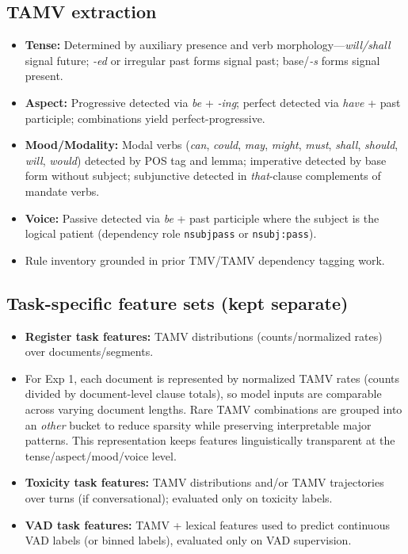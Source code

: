 \documentclass[11pt]{article}
\begin{document}
\subsection{TAMV extraction}
\begin{itemize}
  \item \textbf{Tense:} Determined by auxiliary presence and verb morphology---\emph{will/shall} signal future; \emph{-ed} or irregular past forms signal past; base/\emph{-s} forms signal present. \citep{Biber20101999LongmanEnglish}
  \item \textbf{Aspect:} Progressive detected via \emph{be} + \emph{-ing}; perfect detected via \emph{have} + past participle; combinations yield perfect-progressive. \citep{Biber20101999LongmanEnglish}
  \item \textbf{Mood/Modality:} Modal verbs (\emph{can}, \emph{could}, \emph{may}, \emph{might}, \emph{must}, \emph{shall}, \emph{should}, \emph{will}, \emph{would}) detected by POS tag and lemma; imperative detected by base form without subject; subjunctive detected in \emph{that}-clause complements of mandate verbs. \citep{Biber20101999LongmanEnglish}
  \item \textbf{Voice:} Passive detected via \emph{be} + past participle where the subject is the logical patient (dependency role \texttt{nsubjpass} or \texttt{nsubj:pass}). \citep{Ramm2017AnnotatingGerman}
  \item Rule inventory grounded in prior TMV/TAMV dependency tagging work. \citep{Ramm2017AnnotatingGerman,DonickeClause-LevelGerman}
\end{itemize}

\subsection{Task-specific feature sets (kept separate)}
\begin{itemize}
  \item \textbf{Register task features:} TAMV distributions (counts/normalized rates) over documents/segments.
  \item For Exp 1, each document is represented by normalized TAMV rates (counts divided by document-level clause totals), so model inputs are comparable across varying document lengths. Rare TAMV combinations are grouped into an \emph{other} bucket to reduce sparsity while preserving interpretable major patterns. This representation keeps features linguistically transparent at the tense/aspect/mood/voice level.
  \item \textbf{Toxicity task features:} TAMV distributions and/or TAMV trajectories over turns (if conversational); evaluated only on toxicity labels.
  \item \textbf{VAD task features:} TAMV + lexical features used to predict continuous VAD labels (or binned labels), evaluated only on VAD supervision.
\end{itemize}
\end{document}
